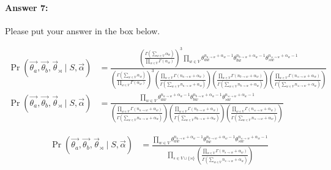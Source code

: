 \documentclass[10pt]{article}
\newenvironment{AnswerBox}{\begin{mdframed}[style=simple]}{\end{mdframed}}
\begin{document}
\paragraph{Answer 7:}  Please put your answer in the box below.


\begin{AnswerBox}%

\begin{align*}
    \Pr(\vec{\theta_a}, \vec{\theta_b}, \vec{\theta}_{\rtimes} \mid S,\vec{\alpha}) & = \frac{\left (\frac{\Gamma (\sum_{w\in V} \alpha_{w})}{\prod_{w\in V} \Gamma (\alpha_{w})}\right )^3 \prod_{w\in V} \theta_{aw}^{n_{a \rightarrow w}+ \alpha_{w} -1} \theta_{bw}^{n_{b \rightarrow w}+\alpha_{w} -1} \theta_{\rtimes w}^{n_{\rtimes \rightarrow w}+\alpha_{w} -1}}{\left (\frac{\Gamma (\sum_{w\in V} \alpha_{w})}{\prod_{w\in V} \Gamma (\alpha_{w})}\right )^3 
    \left (\frac{\prod_{w\in V} \Gamma(n_{a \rightarrow w}+ \alpha_{w})}{\Gamma (\sum_{w\in V} n_{a \rightarrow w}+ \alpha_{w})}\right)
    \left (\frac{\prod_{w\in V} \Gamma (n_{b \rightarrow w}+ \alpha_{w})}{\Gamma (\sum_{w\in V} n_{b \rightarrow w}+ \alpha_{w})}\right)
    \left (\frac{\prod_{w\in V} \Gamma (n_{\rtimes \rightarrow w}+ \alpha_{w})}{\Gamma (\sum_{w\in V} n_{\rtimes \rightarrow w}+ \alpha_{w})}\right)} \\
    \Pr(\vec{\theta_a}, \vec{\theta_b}, \vec{\theta}_{\rtimes} \mid S,\vec{\alpha}) & = \frac{\prod_{w\in V} \theta_{aw}^{n_{a \rightarrow w}+ \alpha_{w} -1} \theta_{bw}^{n_{b \rightarrow w}+\alpha_{w} -1} \theta_{\rtimes w}^{n_{\rtimes \rightarrow w}+\alpha_{w} -1}}{ 
    \left (\frac{\prod_{w\in V} \Gamma (n_{a \rightarrow w}+ \alpha_{w})}{\Gamma (\sum_{w\in V} n_{a \rightarrow w}+ \alpha_{w})}\right)
    \left (\frac{\prod_{w\in V} \Gamma (n_{b \rightarrow w}+ \alpha_{w})}{\Gamma (\sum_{w\in V} n_{b \rightarrow w}+ \alpha_{w})}\right)
    \left (\frac{\prod_{w\in V} \Gamma (n_{\rtimes \rightarrow w}+ \alpha_{w})}{\Gamma (\sum_{w\in V} n_{\rtimes \rightarrow w}+ \alpha_{w})}\right)}
\end{align*}

\begin{align}
    \Pr(\vec{\theta_a}, \vec{\theta_b}, \vec{\theta}_{\rtimes} \mid S,\vec{\alpha}) & = \frac{\prod_{w\in V} \theta_{aw}^{n_{a \rightarrow w}+ \alpha_{w} -1} \theta_{bw}^{n_{b \rightarrow w}+\alpha_{w} -1} \theta_{\rtimes w}^{n_{\rtimes \rightarrow w}+\alpha_{w} -1}}{\prod_{s\in V\cup \{\rtimes\}} \left (\frac{\prod_{w\in V} \Gamma (n_{s \rightarrow w}+ \alpha_{w})}{\Gamma (\sum_{w\in V} n_{s \rightarrow w}+ \alpha_{w})}\right)}
\end{align}
    
\end{AnswerBox}%
\end{document}
